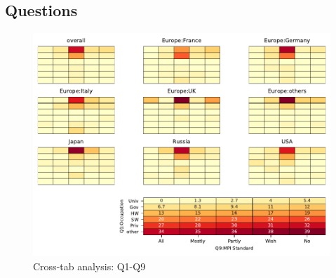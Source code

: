 
\subsection{Questions}


\begin{figure}
\begin{center}
\includegraphics[width=12cm]{../pdfs/Q1-Q9.pdf}
\caption{Cross-tab analysis: Q1-Q9}
\label{fig:Q1-Q9}
\end{center}
\end{figure}
